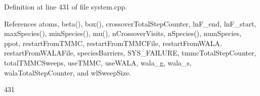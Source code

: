 Definition at line 431 of file system.\-cpp.



References atoms, beta(), box(), crossover\-Total\-Step\-Counter, ln\-F\-\_\-end, ln\-F\-\_\-start, max\-Species(), min\-Species(), mu(), n\-Crossover\-Visits, n\-Species(), num\-Species, ppot, restart\-From\-T\-M\-M\-C, restart\-From\-T\-M\-M\-C\-File, restart\-From\-W\-A\-L\-A, restart\-From\-W\-A\-L\-A\-File, species\-Barriers, S\-Y\-S\-\_\-\-F\-A\-I\-L\-U\-R\-E, tmmc\-Total\-Step\-Counter, total\-T\-M\-M\-C\-Sweeps, use\-T\-M\-M\-C, use\-W\-A\-L\-A, wala\-\_\-g, wala\-\_\-s, wala\-Total\-Step\-Counter, and wl\-Sweep\-Size.


\begin{DoxyCode}
431                                                                                                            
                                                                                                                  

\end{DoxyCode}
